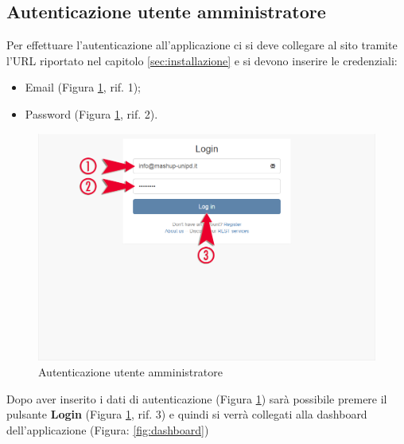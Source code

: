 		\subsection{Autenticazione utente amministratore} %
		\label{sec:autenticazione_utente}
			Per effettuare l'autenticazione\gloss{} all'applicazione ci si deve collegare al sito tramite l'URL\gloss{} riportato nel capitolo \ref{sec:installazione} e si devono inserire le credenziali:
			\begin{itemize}
				\item Email (Figura \ref{fig:registrazione_utente_accesso}, rif. 1);
				\item Password (Figura \ref{fig:registrazione_utente_accesso}, rif. 2).
			\end{itemize}
			\begin{figure}[H]
				\centering
				\centerline{\includegraphics[width=14cm]{images/autenticazione_utente.png}}
				\caption{Autenticazione utente amministratore}
				\label{fig:registrazione_utente_accesso}
			\end{figure}
			\noindent
			Dopo aver inserito i dati di autenticazione\gloss{} (Figura \ref{fig:registrazione_utente_accesso}) sarà possibile premere il pulsante \textbf{Login}\gloss{} (Figura \ref{fig:registrazione_utente_accesso}, rif. 3) e quindi si verrà collegati alla dashboard\gloss{} dell'applicazione (Figura: \ref{fig:dashboard})
			\pagebreak
